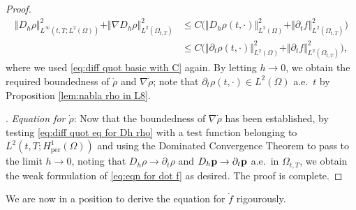 \documentclass[11pt,a4paper,reqno]{amsart}
\theoremstyle{remark}
\theoremstyle{definition}
\numberwithin{equation}{section}
\newcommand{\per}{\mathrm{per}}
\newcommand{\p}{{\bf p}}
\begin{document}
\begin{proof}
\begin{equation*}
\begin{aligned}
          \Vert D_h \rho \Vert^2_{L^\infty(t,T;L^2(\Omega))} + \Vert \nabla D_h \rho \Vert^2_{L^2(\Omega_{t,T})}&\leq  C\Big( \Vert D_h \rho (t,\cdot) \Vert^2_{L^2(\Omega)} + \Vert \partial_t f \Vert^2_{L^2(\Omega_{t,T})} \Big) \\ 
          &\leq  C\Big( \Vert \partial_t \rho (t,\cdot) \Vert^2_{L^2(\Omega)} + \Vert \partial_t f \Vert^2_{L^2(\Omega_{t,T})} \Big), 
        \end{aligned}
    \end{equation*}
    where we used \eqref{eq:diff quot basic with C} again. By letting $h \to 0$, we obtain the required boundedness of $\dot{\rho}$ and $\nabla \dot{\rho}$; note that $\partial_t \rho(t,\cdot) \in L^2(\Omega)$ a.e.~$t$ by Proposition \ref{lem:nabla rho in L8}. 

    \smallskip 

    . \textit{Equation for $\dot{\rho}$}: Now that the boundedness of $\nabla\dot{\rho}$ has been established, by testing \eqref{eq:diff quot eq for Dh rho} with a test function belonging to $L^2(t,T;H^1_\per(\Omega))$ and using the Dominated Convergence Theorem to pass to the limit $h \to 0$, noting that $D_h \rho \to \partial_t \rho $ and $D_h \p \to \partial_t \p$ a.e.~in $\Omega_{t,T}$, we obtain the weak formulation of \eqref{eq:eqn for dot f} as desired. The proof is complete. 
\end{proof}

We are now in a position to derive the equation for $\dot{f}$ rigourously. 
\end{document}

